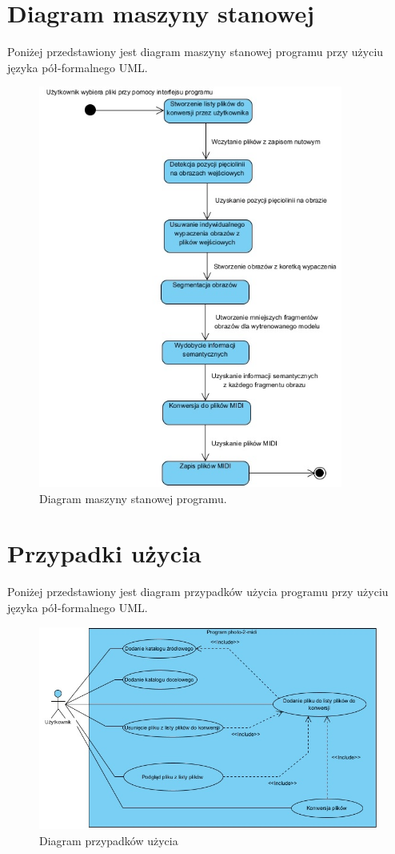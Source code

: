 \section{Diagram maszyny stanowej}
Poniżej przedstawiony jest diagram maszyny stanowej programu przy użyciu języka pół-formalnego UML.
\begin{figure}
	\centering
	\includegraphics[width=10cm]{images/Diagram-maszyny-stanowej-programu.jpg}
	\caption{Diagram maszyny stanowej programu.}
	\label{fig:program-state-machine}
\end{figure}


\section{Przypadki użycia}
Poniżej przedstawiony jest diagram przypadków użycia programu przy użyciu języka pół-formalnego UML.

\begin{figure}[htb]
	\centering
	\includegraphics[width=14cm]{images/p2m-usecase-diagram}
	\caption{Diagram przypadków użycia}
	\label{fig:usecase-diagram}
\end{figure}

